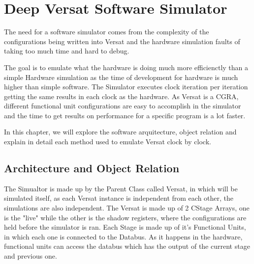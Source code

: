\chapter{Deep Versat Software Simulator}
\label{chapter:Simulator}

The need for a software simulator comes from the complexity of the configurations 
being written into Versat and the hardware simulation faults of taking too much time and hard to debug.

The goal is to emulate what the hardware is doing much more efficienctly than 
a simple Hardware simulation as the time of development for hardware
is much higher than simple software. The Simulator executes clock iteration per iteration 
getting the same results in each clock as the hardware. 
As Versat is a CGRA, different functional unit configurations are easy to accomplish 
in the simulator and the time to get results on performance
for a specific program is a lot faster. 

In this chapter, we will explore the software arquitecture, 
object relation and explain in detail each method used to emulate Versat clock by clock.




\section{Architecture and Object Relation}

The Simualtor is made up by the Parent Class called Versat, in which will be simulated itself, 
as each Versat instance is independent from each other, the simulations are also independent.
The Versat is made up of 2 CStage Arrays, one is the "live" while the other is the 
shadow registers, where the configurations are held before the simulator is ran.
Each Stage is made up of it's Functional Units, in which each one is connected to the Databus.
As it happens in the hardware, functional units can access the databus which has the output 
of the current stage and previous one.
\clearpage

